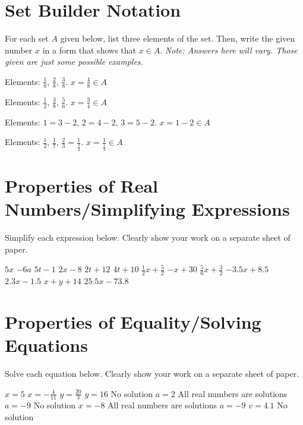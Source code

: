 \section*{Set Builder Notation}
For each set $A$ given below, list three elements of the set. Then, write the given number $x$ in a form that shows that $x\in A$.
\emph{Note: Answers here will vary. Those given are just some possible examples.}
\begin{senum}
\item Elements: $\frac{1}{8}$, $\frac{2}{8}$, $\frac{3}{8}$. $x=\frac{4}{8}\in A$
\item Elements: $\frac{1}{2}$, $\frac{3}{8}$, $\frac{5}{6}$. $x=\frac{3}{4}\in A$
\item Elements: $1=3-2$, $2=4-2$, $3=5-2$. $x=1-2\in A$
\item Elements: $\frac{1}{2}$, $\frac{1}{7}$, $\frac{2}{3}=\frac{1}{\frac{3}{2}}$. $x=\frac{1}{\frac{1}{3}}\in A$
\end{senum}

\section*{Properties of Real Numbers/Simplifying Expressions}
Simplify each expression below. Clearly show your work on a separate sheet of paper.
\begin{smenum}
\mitemxxx
{$5x$}
{$-6a$}
{$5t-1$}
\mitemxxxx
{$2x-8$}
{$2t+12$}
{$4t+10$}
{$\frac{1}{2}x+\frac{5}{2}$}
\mitemxxxx
{$-x+30$}
{$\frac{5}{6}x+\frac{3}{2}$}
{$-3.5x + 8.5$}
{$2.3x-1.5$}
\mitemxx
{$x+y+14$}
{$25.5x-73.8$}
\end{smenum}

\section*{Properties of Equality/Solving Equations}
Solve each equation below. Clearly show your work on a separate sheet of paper.
\begin{smenum}
\mitemxx
{$x=5$}
{$x=-\frac{4}{11}$}
\mitemxx
{$y=\frac{20}{3}$}
{$y=16$}
\mitemxx
{No solution}
{$a=2$}
\mitemxx
{All real numbers are solutions}
{$a=-9$}
\mitemxx
{No solution}
{$x=-8$}
\mitemxx
{All real numbers are solutions}
{$a=-9$}
\mitemxx
{$v=4.1$}
{No solution}
\end{smenum}

